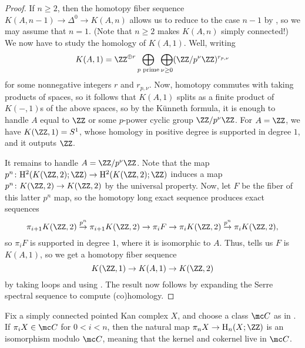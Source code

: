 \documentclass[../notes.tex]{subfiles}
\begin{document}
\begin{proof}
	If $n\ge2$, then the homotopy fiber sequence $K(A,n-1)\to\Delta^0\to K(A,n)$ allows us to reduce to the case $n-1$ by , so we may assume that $n=1$. (Note that $n\ge2$ makes $K(A,n)$ simply connected!) We now have to study the homology of $K(A,1)$. Well, writing
	\[K(A,1)=\ZZ^{\oplus r}\bigoplus_{p\text{ prime}}\bigoplus_{\nu\ge0}(\ZZ/p^\nu\ZZ)^{r_{p,\nu}}\]
	for some nonnegative integers $r$ and $r_{p,\nu}$. Now, homotopy commutes with taking products of spaces, so it follows that $K(A,1)$ splits as a finite product of $K(-,1)$s of the above spaces, so by the K\"unneth formula, it is enough to handle $A$ equal to $\ZZ$ or some $p$-power cyclic group $\ZZ/p^\nu\ZZ$. For $A=\ZZ$, we have $K(\ZZ,1)=S^1$, whose homology in positive degree is supported in degree $1$, and it outputs $\ZZ$.

	It remains to handle $A=\ZZ/p^\nu\ZZ$. Note that the map $p^n\colon\mathrm H^2(K(\ZZ,2);\ZZ)\to\mathrm H^2(K(\ZZ,2);\ZZ)$ induces a map $p^n\colon K(\ZZ,2)\to K(\ZZ,2)$ by the universal property. Now, let $F$ be the fiber of this latter $p^n$ map, so the homotopy long exact sequence produces exact sequences
	\[\pi_{i+1}K(\ZZ,2)\stackrel{p^n}\to\pi_{i+1}K(\ZZ,2)\to\pi_iF\to\pi_iK(\ZZ,2)\stackrel{p^n}\to\pi_iK(\ZZ,2),\]
	so $\pi_iF$ is supported in degree $1$, where it is isomorphic to $A$. Thus,  tells us $F$ is $K(A,1)$, so we get a homotopy fiber sequence
	\[K(\ZZ,1)\to K(A,1)\to K(\ZZ,2)\]
	by taking loops and using . The result now follows by expanding the Serre spectral sequence to compute (co)homology.
\end{proof}
\begin{theorem} \label{thm:mod-c-hur}
	Fix a simply connected pointed Kan complex $X$, and choose a class $\mc C$ as in . If $\pi_iX\in\mc C$ for $0<i<n$, then the natural map $\pi_nX\to\mathrm H_n(X;\ZZ)$ is an isomorphism modulo $\mc C$, meaning that the kernel and cokernel live in $\mc C$.
\end{theorem}
\end{document}
